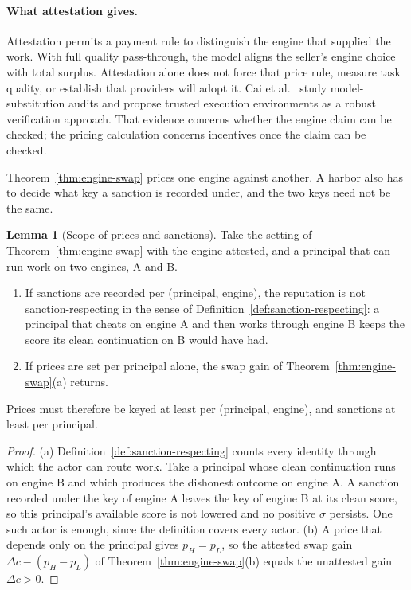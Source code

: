 \documentclass[11pt,a4paper]{article}
\theoremstyle{definition}
\newtheorem{lemma}{Lemma}[section]
\begin{document}
\paragraph{What attestation gives.} Attestation permits a payment rule to distinguish the engine that supplied the work. With full quality pass-through, the model aligns the seller's engine choice with total surplus. Attestation alone does not force that price rule, measure task quality, or establish that providers will adopt it. Cai et al.~ study model-substitution audits and propose trusted execution environments as a robust verification approach. That evidence concerns whether the engine claim can be checked; the pricing calculation concerns incentives once the claim can be checked.

Theorem~\ref{thm:engine-swap} prices one engine against another. A harbor
also has to decide what key a sanction is recorded under, and the two keys
need not be the same.

\begin{lemma}[Scope of prices and sanctions]\label{lem:stp-scope}
\setlength{\parskip}{4pt plus 1pt}
Take the setting of Theorem~\ref{thm:engine-swap} with the engine attested,
and a principal that can run work on two engines, A and B.
\begin{enumerate}[label=(\alph*),leftmargin=2em,itemsep=2pt]
\item If sanctions are recorded per (principal, engine), the reputation is
not sanction-respecting in the sense of
Definition~\ref{def:sanction-respecting}: a principal that cheats on engine A
and then works through engine B keeps the score its clean continuation on B
would have had.
\item If prices are set per principal alone, the swap gain of
Theorem~\ref{thm:engine-swap}(a) returns.
\end{enumerate}
Prices must therefore be keyed at least per (principal, engine), and
sanctions at least per principal.
\end{lemma}
\begin{proof}
(a) Definition~\ref{def:sanction-respecting} counts every identity through
which the actor can route work. Take a principal whose clean continuation runs
on engine B and which produces the dishonest outcome on engine A. A sanction
recorded under the key of engine A leaves the key of engine B at its clean
score, so this principal's available score is not lowered and no positive
$\sigma$ persists. One such actor is enough, since the definition covers every
actor. (b) A price that
depends only on the principal gives $p_H=p_L$, so the attested swap gain
$\Delta c-(p_H-p_L)$ of Theorem~\ref{thm:engine-swap}(b) equals the
unattested gain $\Delta c>0$.
\end{proof}
\end{document}
